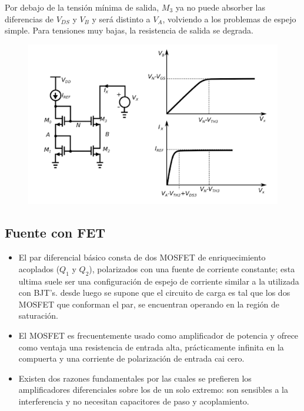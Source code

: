 \documentclass[conference]{IEEEtran} %
\begin{document}
	Por debajo de la tensión mínima de salida, $M_3$ ya no puede 
	absorber las diferencias de $V_{DS}$ y $V_B$ y será distinto a 
	$V_A$, volviendo a los problemas de espejo simple. Para tensiones
	muy bajas, la resistencia de salida se degrada.
	
	\begin{figure}
		\includegraphics[scale=0.3]{IMAGENES/image4.png}
	\end{figure}


\subsection{Fuente con FET}


			\begin{itemize}
				\item El par diferencial básico consta de dos MOSFET de enriquecimiento acoplados ($Q_1$ y $Q_2$), polarizados con una fuente de corriente constante; esta ultima suele ser una configuración de espejo de corriente similar a la utilizada con BJT’s. desde luego se supone que el circuito de carga es tal que los dos MOSFET que conforman el par, se encuentran operando en la región de saturación.
				\item El MOSFET es frecuentemente usado como amplificador de potencia y ofrece como ventaja una resistencia de entrada alta, prácticamente infinita en la compuerta y una corriente de polarización de entrada cai cero.
				\item Existen dos razones fundamentales por las cuales se prefieren los amplificadores diferenciales sobre los de un solo extremo: son sensibles a la interferencia y no necesitan capacitores de paso y acoplamiento.
			\end{itemize}
\end{document}
